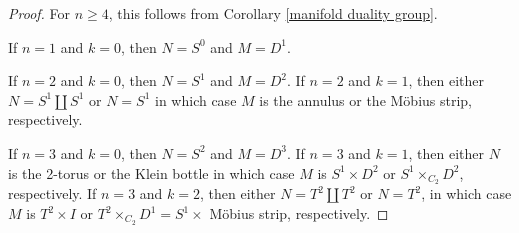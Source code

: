 \documentclass[12pt]{amsart}
\theoremstyle{definition}
\begin{document}
 
\begin{proof}
For $n \geq 4$, this follows from Corollary \ref{manifold duality group}.

If $n =1$ and $k = 0$, then $N = S^0$ and $M = D^1$.  

If $n = 2$ and $k = 0$, then $N = S^1$ and $M = D^2$.  If $n =2$ and $k = 1$, then either $N = S^1 \amalg S^1$ or $N = S^1$ in which case $M$ is the annulus or the M\"obius strip, respectively. 

If $n = 3$ and $k = 0$, then $N = S^2$ and $M = D^3$. If $n =3$ and $k = 1$, then either $N$ is the 2-torus or the Klein bottle  in which case $M$ is $S^1 \times D^2$ or  $S^1 \times_{C_2} D^2$, respectively. 
If $n =3$ and $k = 2$, then either $N = T^2 \amalg T^2$ or $N = T^2$,
in which case $M$ is $T^2 \times I$ or $T^2 \times_{C_2} D^1= S^1 \times $ M\"obius strip, respectively. 
\end{proof}
\end{document}
